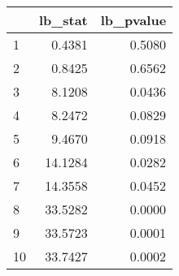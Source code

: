\begin{tabular}{lrr}
\toprule
{} &  lb\_stat &  lb\_pvalue \\
\midrule
1  &   0.4381 &     0.5080 \\
2  &   0.8425 &     0.6562 \\
3  &   8.1208 &     0.0436 \\
4  &   8.2472 &     0.0829 \\
5  &   9.4670 &     0.0918 \\
6  &  14.1284 &     0.0282 \\
7  &  14.3558 &     0.0452 \\
8  &  33.5282 &     0.0000 \\
9  &  33.5723 &     0.0001 \\
10 &  33.7427 &     0.0002 \\
\bottomrule
\end{tabular}
